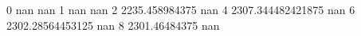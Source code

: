 0 nan nan
1 nan nan
2 2235.458984375 nan
4 2307.344482421875 nan
6 2302.28564453125 nan
8 2301.46484375 nan
